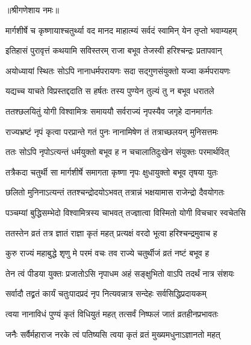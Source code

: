 \label{sec:margashirsha-krishna-chaturthi-mahatmya-varnanam}

\centerline{॥श्रीगणेशाय नमः॥}


\twolineshloka
{मार्गशीर्षे च कृष्णायाश्चतुर्थ्या वद मानद}
{माहात्म्यं सर्वदं स्वामिन् येन तृप्तो भवाम्यहम्} %


\twolineshloka
{इतिहासं पुरावृत्तं कथयामि सविस्तरम्}
{राजा बभूव तेजस्वी हरिश्चन्द्रः प्रतापवान्} %

\twolineshloka
{अयोध्यायां स्थितः सोऽपि नानाधर्मपरायणः}
{सदा सद्गुणसंयुक्तो यज्वा कर्मपरायणः} %

\twolineshloka
{यद्यच्च याचते विप्रस्तद्ददाति स हर्षतः}
{तस्य पुण्येन तुल्यं तु न बभूव धरातले} %

\twolineshloka
{ततश्छलयितुं योगी विश्वामित्रः समाययौ}
{सर्वराज्यं नृपस्यैव जगृहे दानमार्गतः} %

\twolineshloka
{राज्यभ्रष्टं नृपं कृत्वा परप्रान्ते गतं पुनः}
{नानामिषेण तं तत्राच्छलयन् मुनिसत्तमः} %

\twolineshloka
{ततः सोऽपि नृपोऽत्यन्तं धर्मयुक्तो बभूव ह}
{न चचालातिदुःखेन संयुक्तः परमार्थवित्} %

\twolineshloka
{तत्रैकदा चतुर्थी सा मार्गशीर्षे समागता}
{कृष्णा नृपः क्षुधायुक्तो बभूव तृषया युतः} %

\twolineshloka
{छलितो मुनिनाऽत्यन्तं ततश्चन्द्रोदयोऽभवत्}
{तत्रान्नं भक्षयामास राजेन्द्रो दैवयोगतः} %

\twolineshloka
{पञ्चम्यां बुद्धिसम्भेदो विश्वामित्रस्य चाभवत्}
{तज्ज्ञात्वा विस्मितो योगी विचचार स्वचेतसि} %

\twolineshloka
{ततस्तेन व्रतं तत्र ज्ञातं राज्ञा कृतं महत्}
{प्रत्यक्षं वरदो भूत्वा हरिश्चन्द्रमुवाच ह} %

\twolineshloka
{कुरु राज्यं महाबुद्धे श‍ृणु मे परमं वचः}
{तव राज्ये चतुर्थीजं व्रतं नष्टं बभूव ह} %

\twolineshloka
{तेन त्वं पीडया युक्तः प्रजातोऽसि नृपाधम}
{अहं सङ्क्षुभितो वाऽपि तदर्थं नात्र संशयः} %

\twolineshloka
{सर्वादौ तद्व्रतं कार्यं चतुःपादप्रदं नृप}
{नित्यवन्नात्र सन्देहः सर्वसिद्धिप्रदायकम्} %

\twolineshloka
{त्वया नानाविधं पुण्यं कृतं विधियुतं महत्}
{तत्सर्वं निष्फलं जातं व्रतहीनप्रभावतः} %

\twolineshloka
{जनैः सर्वैर्महाराज नरके त्वं पतिष्यसि}
{त्वया कृतं व्रतं मुख्यमधुनाऽज्ञानतो महत्} %

